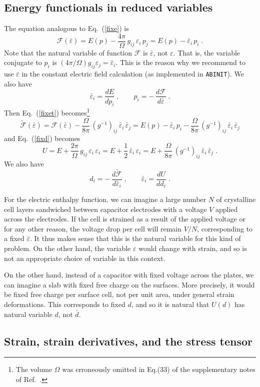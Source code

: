 \documentclass[11pt,fleqn]{article}
\def\beq{\begin{equation}}
\def\eeq{\end{equation}}
\def\ee{{\varepsilon}}
\def\eb{\bar{\ee}}
\def\db{\bar{d}}
\def\O{\Omega}
\def\foo{\frac{4\pi}{\O}}
\def\too{\frac{2\pi}{\O}}
\def\F{\mathcal{F}}
\def\Ft{{\widetilde{\F}}}
\def\gg{g_{ij}}
\def\ABINIT{{{\tt ABINIT}}}
\begin{document}
\subsection{Energy functionals in reduced variables}

The equation analogous to Eq.~(\ref{fixe}) is
%
\beq
\F(\eb)=E(p)-\foo\,\gg\,\ee_i\,p_j
      =E(p)-\eb_i\,p_i \;.
\label{eq:fixeb}
\eeq
%
Note that the natural variable of function $\F$ is $\eb$, not $\ee$.
That is, the variable conjugate to $p_i$ is
$(4\pi/\O)\gg\ee_j=\eb_i$. This is the reason why we recommend to
use $\eb$ in the constant electric field calculation (as implemented
in \ABINIT).
We also have
%
\beq
\eb_i=\frac{dE}{dp_i} \;,\qquad p_i=-\,\frac{d\F}{d\eb}\;.
\eeq
%
Then Eq.~(\ref{fixet}) becomes\footnote{The volume $\O$ was erroneously
omitted in Eq.(33) of the supplementary notes of Ref.~\cite{ssv}.}
%
\beq
\Ft(\eb)=\F(\eb)-\frac{\O}{8\pi}\,(g^{-1})_{ij}\,\eb_i\,\eb_j
        =E(p)-\eb_i\,p_i-\frac{\O}{8\pi}\,(g^{-1})_{ij}\,\eb_i\,\eb_j
\eeq
%
and Eq.~(\ref{fixd}) becomes
%
\beq
U=E+\too\,\gg\,\ee_i\,\ee_i
 =E+\frac{1}{2}\,\eb_i\,\ee_i 
 =E+\frac{\O}{8\pi}\,(g^{-1})_{ij}\,\eb_i\,\eb_j\;.
\label{eq:fixdred}
\eeq
We also have
%
\beq
d_i=-\,\frac{d\Ft}{d\eb_i} \;,\qquad \eb_i=\frac{dU}{dd_i}  \;.
\eeq

For the electric enthalpy function, we can imagine a large number
$N$ of crystalline cell layers sandwiched between capacitor
electrodes with a voltage $V$ applied across the electrodes.  If
the cell is strained as a result of the applied voltage or for any
other reason, the voltage drop per cell will remain $V/N$,
corresponding to a fixed $\eb$.  It thus makes sense that this is
the natural variable for this kind of problem.  On the other hand,
the variable $\ee$ would change with strain, and so is not an
appropriate choice of variable in this context.

On the other hand, instead of a capacitor with fixed voltage
across the plates, we can imagine a slab with fixed free charge
on the surfaces.  More precisely, it would be fixed free
charge per surface cell, not per unit area, under general strain
deformations.  This corresponds to fixed $d$, and so it is
natural that $U(d)$ has natural variable $d$, not $\db$.

\subsection{Strain, strain derivatives, and the stress tensor}
\end{document}
